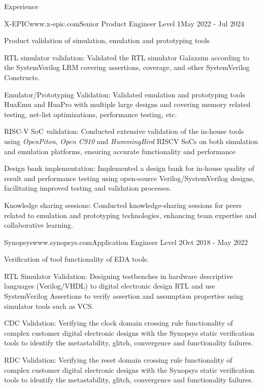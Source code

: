 \documentclass[
11pt, %
]{./assets/resume} %
\begin{document}
\begin{rSection}{Experience}
	\begin{rSubsectionX}{X-EPIC}{www.x-epic.com}{Senior Product Engineer Level 1}{May 2022 - Jul 2024}
		\item Product validation of simulation, emulation and prototyping tools 
		\item RTL simulator validation: Validated the RTL simulator Galaxsim according to the SystemVerilog LRM covering assertions, coverage, and other SystemVerilog Constructs. 
		\item Emulator/Prototyping Validation: Validated emulation and prototyping tools HuaEmu and HuaPro with multiple large designs and covering memory related testing, net-list optimizations, performance testing, etc. 
		\item RISC-V SoC validation: Conducted extensive validation of the in-house tools using \textit{OpenPiton}, \textit{Open C910} and \textit{HummingBird} RISCV SoCs on both simulation and emulation platforms, ensuring accurate functionality and performance 
		\item Design bank implementation: Implemented a design bank for in-house quality of result and performance testing using open-source Verilog/SystemVerilog designs, facilitating improved testing and validation processes. 
		\item Knowledge sharing sessions: Conducted knowledge-sharing sessions for peers related to emulation and prototyping technologies, enhancing team expertise and collaborative learning.
	\end{rSubsectionX}
	\begin{rSubsectionX}{Synopsys}{www.synopsys.com}{Application Engineer Level 2}{Oct 2018 - May 2022}
		\item Verification of tool functionality of EDA tools.
		\item RTL Simulator Validation: Designing testbenches in hardware descriptive languages (Verilog/VHDL) to digital electronic design RTL and use SystemVerilog Assertions to verify assertion and assumption properties using simulator tools such as VCS. 
		\item CDC Validation: Verifying the clock domain crossing rule functionality of complex customer digital electronic designs with the Synopsys static verification tools to identify the metastability, glitch, convergence and functionality failures. 
		\item RDC Validation: Verifying the reset domain crossing rule functionality of complex customer digital electronic designs with the Synopsys static verification tools to identify the metastability, glitch, convergence and functionality failures. 

\end{rSubsectionX}
\end{rSection}
\end{document}
